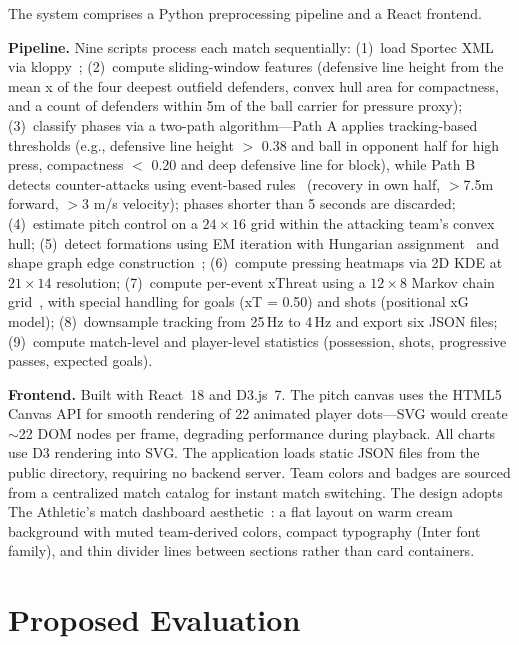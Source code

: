 \documentclass{vgtc}                          %
\begin{document}
The system comprises a Python preprocessing pipeline and a React frontend.

\textbf{Pipeline.} Nine scripts process each match sequentially: (1)~load Sportec XML via kloppy~\cite{kloppy}; (2)~compute sliding-window features (defensive line height from the mean x of the four deepest outfield defenders, convex hull area for compactness, and a count of defenders within 5m of the ball carrier for pressure proxy); (3)~classify phases via a two-path algorithm---Path A applies tracking-based thresholds (e.g., defensive line height $>$ 0.38 and ball in opponent half for high press, compactness $<$ 0.20 and deep defensive line for block), while Path B detects counter-attacks using event-based rules~\cite{bekkers2023} (recovery in own half, $>$7.5m forward, $>$3 m/s velocity); phases shorter than 5 seconds are discarded; (4)~estimate pitch control on a $24{\times}16$ grid within the attacking team's convex hull; (5)~detect formations using EM iteration with Hungarian assignment~\cite{bialkowski2014} and shape graph edge construction~\cite{brandes2025}; (6)~compute pressing heatmaps via 2D KDE at $21{\times}14$ resolution; (7)~compute per-event xThreat using a $12{\times}8$ Markov chain grid~\cite{singh2019}, with special handling for goals (xT = 0.50) and shots (positional xG model); (8)~downsample tracking from 25\,Hz to 4\,Hz and export six JSON files; (9)~compute match-level and player-level statistics (possession, shots, progressive passes, expected goals).

\textbf{Frontend.} Built with React~18 and D3.js~7. The pitch canvas uses the HTML5 Canvas API for smooth rendering of 22 animated player dots---SVG would create ${\sim}$22 DOM nodes per frame, degrading performance during playback. All charts use D3 rendering into SVG. The application loads static JSON files from the public directory, requiring no backend server. Team colors and badges are sourced from a centralized match catalog for instant match switching. The design adopts The Athletic's match dashboard aesthetic~\cite{athletic2023}: a flat layout on warm cream background with muted team-derived colors, compact typography (Inter font family), and thin divider lines between sections rather than card containers.

\section{Proposed Evaluation}
\end{document}

